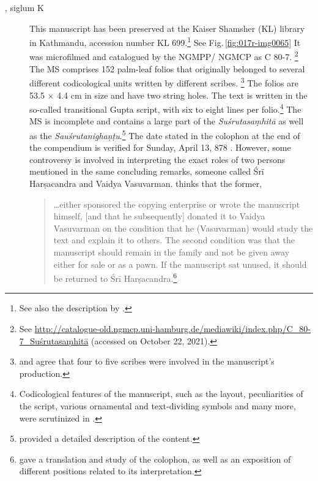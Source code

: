 \begin{description}
    
    \item[, siglum K] This manuscript has been preserved at
the Kaiser Shamsher (KL) library in Kathmandu, accession number KL
699.\footnote{See also the description by \cite[\S 2.1]{kleb-2021b}.} See
Fig.\,\ref{fig:017r-img0065} It was microfilmed and catalogued by the NGMPP/
NGMCP as C 80-7.%
\footnote{See
\url{http://catalogue-old.ngmcp.uni-hamburg.de/mediawiki/index.php/C_80-7_Suśrutasaṃhitā}
 (accessed on October 22, 2021).%
} The MS comprises 152 palm-leaf folios that originally belonged to several
different codicological units written by different scribes.%
\footnote{%
\textcites[46]{bhat-2020} and \textcites[11]{kleb-2021b} agree that four to five
scribes were involved in the manuscript's production. } The folios are 53.5
$\times$ 4.4 cm in size and have two string holes.  The text is written in the
so-called transitional Gupta script, with six to eight lines per
folio.\footnote{Codicological features of the manuscript, such as the layout,
peculiarities of the script, various ornamental and text-dividing symbols and many
more, were scrutinized in \textcites{bhat-2020}.} The MS is incomplete and
contains a large part of the \emph{Suśrutasaṃhitā} as well as the
\emph{Sauśrutanighaṇṭu}.\footnote{\textcite[11]{kleb-2021b} provided a detailed
description of the content.} The date stated in the colophon at the end of the
compendium is verified for Sunday, April 13, 878 \CE. However, some controversy is
involved in interpreting the exact roles of two persons mentioned in the same
concluding remarks, someone called Śrī Harṣacandra and Vaidya Vasuvarman.
\textcites[16]{kleb-2021b} thinks that the former,
    \begin{quote}
        \ldots either sponsored the copying enterprise or wrote the manuscript himself,
        [and that he subsequently] donated it to Vaidya Vasuvarman on the condition that
        he (Vasuvarman) would study the text and explain it to others. The second
        condition was that the manuscript should remain in the family and not be given
        away either for sale or as a pawn. If the manuscript sat unused, it should be
        returned to Śrī Harṣacandra.\footnote{\textcite[13--17]{kleb-2021b} gave a
        translation and study of the colophon, as well as an exposition of different
        positions related to its interpretation.}
    \end{quote}
    

\end{description}
